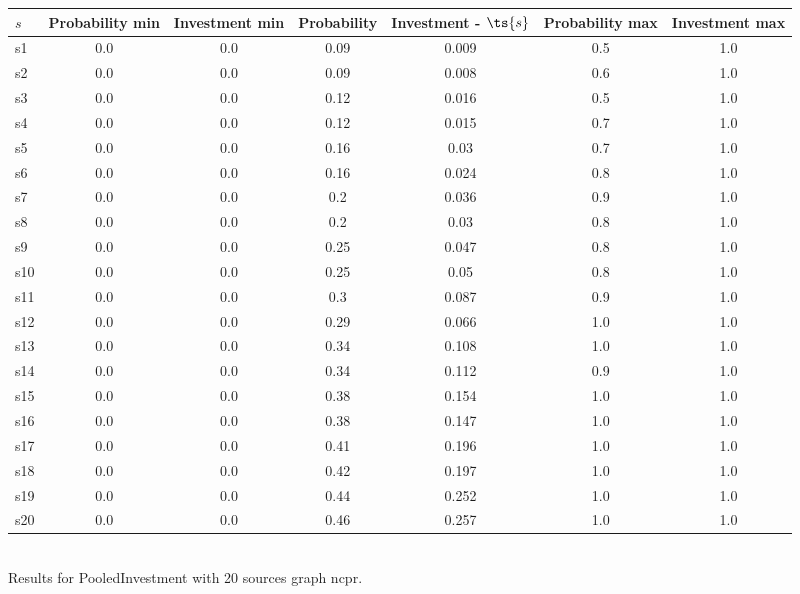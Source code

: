 \documentclass{article}
\begin{document}
\noindent\begin{tabular}{|l|c|c|c|c|c|c|}
\hline
$s$& Probability min & Investment min & Probability & Investment - $\ts{s}$ & Probability max & Investment max\\
\hline
s1 &0.0 & 0.0 & 0.09 & 0.009 & 0.5 & 1.0\\
\hline
s2 &0.0 & 0.0 & 0.09 & 0.008 & 0.6 & 1.0\\
\hline
s3 &0.0 & 0.0 & 0.12 & 0.016 & 0.5 & 1.0\\
\hline
s4 &0.0 & 0.0 & 0.12 & 0.015 & 0.7 & 1.0\\
\hline
s5 &0.0 & 0.0 & 0.16 & 0.03 & 0.7 & 1.0\\
\hline
s6 &0.0 & 0.0 & 0.16 & 0.024 & 0.8 & 1.0\\
\hline
s7 &0.0 & 0.0 & 0.2 & 0.036 & 0.9 & 1.0\\
\hline
s8 &0.0 & 0.0 & 0.2 & 0.03 & 0.8 & 1.0\\
\hline
s9 &0.0 & 0.0 & 0.25 & 0.047 & 0.8 & 1.0\\
\hline
s10 &0.0 & 0.0 & 0.25 & 0.05 & 0.8 & 1.0\\
\hline
s11 &0.0 & 0.0 & 0.3 & 0.087 & 0.9 & 1.0\\
\hline
s12 &0.0 & 0.0 & 0.29 & 0.066 & 1.0 & 1.0\\
\hline
s13 &0.0 & 0.0 & 0.34 & 0.108 & 1.0 & 1.0\\
\hline
s14 &0.0 & 0.0 & 0.34 & 0.112 & 0.9 & 1.0\\
\hline
s15 &0.0 & 0.0 & 0.38 & 0.154 & 1.0 & 1.0\\
\hline
s16 &0.0 & 0.0 & 0.38 & 0.147 & 1.0 & 1.0\\
\hline
s17 &0.0 & 0.0 & 0.41 & 0.196 & 1.0 & 1.0\\
\hline
s18 &0.0 & 0.0 & 0.42 & 0.197 & 1.0 & 1.0\\
\hline
s19 &0.0 & 0.0 & 0.44 & 0.252 & 1.0 & 1.0\\
\hline
s20 &0.0 & 0.0 & 0.46 & 0.257 & 1.0 & 1.0\\
\hline
\end{tabular}\\

\noindent Results for PooledInvestment with 20 sources graph ncpr.
\end{document}
